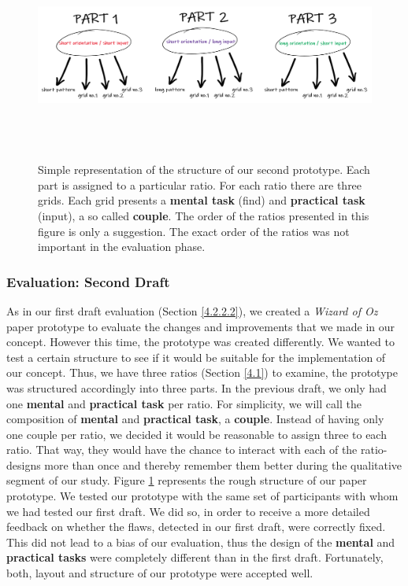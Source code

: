 \begin{figure}[t!]
\centering
\includegraphics[width=15cm, height=7cm]{Chapters/graphics/prototypeStructure.PNG}
\caption{Simple representation of the structure of our second prototype. Each part is assigned to a particular ratio. For each ratio there are three grids. Each grid presents a \textbf{mental task} (find) and \textbf{practical task} (input), a so called \textbf{couple}. The order of the ratios presented in this figure is only a suggestion. The exact order of the ratios was not important in the evaluation phase.}
\label{fig:prototype}
\end{figure}

\subsubsection{Evaluation: Second Draft} \label{4.2.2.4}

As in our first draft evaluation (Section \ref{4.2.2.2}), we created a \textit{Wizard of Oz} paper prototype \cite{Butz2014} to evaluate the changes and improvements that we made in our concept. However this time, the prototype was created differently. We wanted to test a certain structure to see if it would be suitable for the implementation of our concept. Thus, we have three ratios (Section \ref{4.1}) to examine, the prototype was structured accordingly into three parts. In the previous draft, we only had one \textbf{mental} and \textbf{practical task} per ratio. For simplicity, we will call the composition of \textbf{mental} and \textbf{practical task}, a \textbf{couple}. Instead of having only one couple per ratio, we decided it would be reasonable to assign three to each ratio. That way, they  would have the chance to interact with each of the ratio-designs more than once and thereby remember them better during the qualitative segment of our study. Figure \ref{fig:prototype} represents the rough structure of our paper prototype. We tested our prototype with the same set of participants with whom we had tested our first draft. We did so, in order to receive a more detailed feedback on whether the flaws, detected in our first draft, were correctly fixed. This did not lead to a bias of our evaluation, thus the design of the \textbf{mental} and \textbf{practical tasks} were completely different than in the first draft. Fortunately, both, layout and structure of our prototype were accepted well. \\

